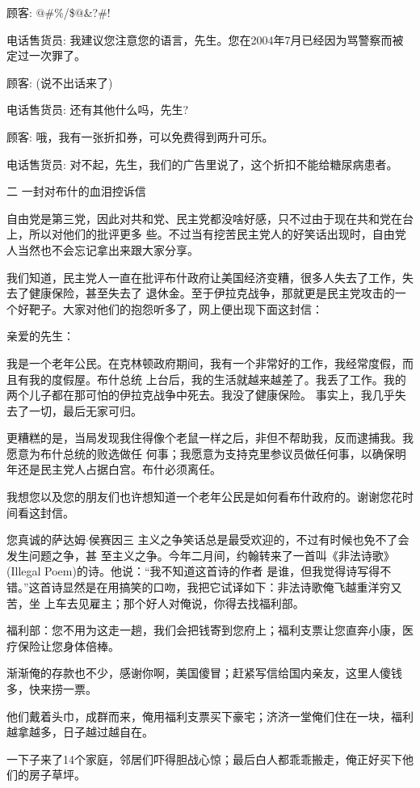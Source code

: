 ﻿\documentclass[11pt]{article}
\begin{document}
顾客: $@$\#\%/\$$@$\&?\#!

电话售货员: 我建议您注意您的语言，先生。您在2004年7月已经因为骂警察而被定过一次罪了。

顾客: (说不出话来了)

电话售货员: 还有其他什么吗，先生?

顾客: 哦，我有一张折扣券，可以免费得到两升可乐。

电话售货员: 对不起，先生，我们的广告里说了，这个折扣不能给糖尿病患者。

二 一封对布什的血泪控诉信

自由党是第三党，因此对共和党、民主党都没啥好感，只不过由于现在共和党在台上，所以对他们的批评更多
些。不过当有挖苦民主党人的好笑话出现时，自由党人当然也不会忘记拿出来跟大家分享。

我们知道，民主党人一直在批评布什政府让美国经济变糟，很多人失去了工作，失去了健康保险，甚至失去了
退休金。至于伊拉克战争，那就更是民主党攻击的一个好靶子。大家对他们的抱怨听多了，网上便出现下面这封信：

亲爱的先生：

我是一个老年公民。在克林顿政府期间，我有一个非常好的工作，我经常度假，而且有我的度假屋。布什总统
上台后，我的生活就越来越差了。我丢了工作。我的两个儿子都在那可怕的伊拉克战争中死去。我没了健康保险。
事实上，我几乎失去了一切，最后无家可归。

更糟糕的是，当局发现我住得像个老鼠一样之后，非但不帮助我，反而逮捕我。我愿意为布什总统的败选做任
何事；我愿意为支持克里参议员做任何事，以确保明年还是民主党人占据白宫。布什必须离任。

我想您以及您的朋友们也许想知道一个老年公民是如何看布什政府的。谢谢您花时间看这封信。

您真诚的萨达姆$\cdot$侯赛因三 主义之争笑话总是最受欢迎的，不过有时候也免不了会发生问题之争，甚
至主义之争。今年二月间，约翰转来了一首叫《非法诗歌》(Illegal Poem)的诗。他说：``我不知道这首诗的作者
是谁，但我觉得诗写得不错。''这首诗显然是在用搞笑的口吻，我把它试译如下：非法诗歌俺飞越重洋穷又苦，坐
上车去见雇主；那个好人对俺说，你得去找福利部。

福利部：您不用为这走一趟，我们会把钱寄到您府上；福利支票让您直奔小康，医疗保险让您身体倍棒。

渐渐俺的存款也不少，感谢你啊，美国傻冒；赶紧写信给国内亲友，这里人傻钱多，快来捞一票。

他们戴着头巾，成群而来，俺用福利支票买下豪宅；济济一堂俺们住在一块，福利越拿越多，日子越过越自在。

一下子来了14个家庭，邻居们吓得胆战心惊；最后白人都乖乖搬走，俺正好买下他们的房子草坪。
\end{document}
